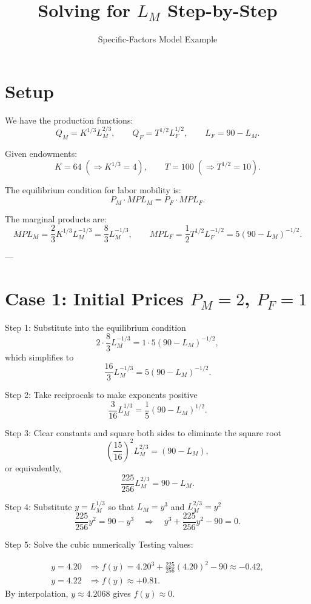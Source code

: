 \documentclass[12pt]{article}
\title{Solving for $L_M$ Step-by-Step}
\author{Specific-Factors Model Example}
\date{}
\begin{document}
\maketitle

\section*{Setup}

We have the production functions:
\[
Q_M = K^{1/3}L_M^{2/3}, \qquad Q_F = T^{1/2}L_F^{1/2}, \qquad L_F = 90 - L_M.
\]

Given endowments:
\[
K=64 \;(\Rightarrow K^{1/3}=4), \qquad T=100 \;(\Rightarrow T^{1/2}=10).
\]

The equilibrium condition for labor mobility is:
\[
P_M \cdot MPL_M = P_F \cdot MPL_F.
\]

The marginal products are:
\[
MPL_M = \frac{2}{3}K^{1/3}L_M^{-1/3} = \frac{8}{3}L_M^{-1/3}, \qquad
MPL_F = \frac{1}{2}T^{1/2}L_F^{-1/2} = 5(90-L_M)^{-1/2}.
\]

---

\section*{Case 1: Initial Prices $P_M=2$, $P_F=1$}

\noindent Step 1: Substitute into the equilibrium condition
\[
2 \cdot \frac{8}{3}L_M^{-1/3} = 1 \cdot 5(90 - L_M)^{-1/2},
\]
which simplifies to
\[
\frac{16}{3}L_M^{-1/3} = 5(90 - L_M)^{-1/2}.
\]

\bigskip
\noindent Step 2: Take reciprocals to make exponents positive
\[
\frac{3}{16}L_M^{1/3} = \frac{1}{5}(90 - L_M)^{1/2}.
\]

\bigskip
\noindent Step 3: Clear constants and square both sides to eliminate the square root
\[
\left(\frac{15}{16}\right)^2 L_M^{2/3} = (90 - L_M),
\]
or equivalently,
\[
\frac{225}{256}L_M^{2/3} = 90 - L_M.
\]

\bigskip
\noindent Step 4: Substitute $y = L_M^{1/3}$ so that $L_M = y^3$ and $L_M^{2/3} = y^2$
\[
\frac{225}{256}y^2 = 90 - y^3 \quad \Rightarrow \quad y^3 + \frac{225}{256}y^2 - 90 = 0.
\]

\bigskip
\noindent Step 5: Solve the cubic numerically  
Testing values:

\[
\begin{aligned}
y=4.20 &\Rightarrow f(y) = 4.20^3 + \frac{225}{256}(4.20)^2 - 90 \approx -0.42,\\
y=4.22 &\Rightarrow f(y) \approx +0.81.
\end{aligned}
\]
By interpolation, $y \approx 4.2068$ gives $f(y) \approx 0$.
\end{document}
